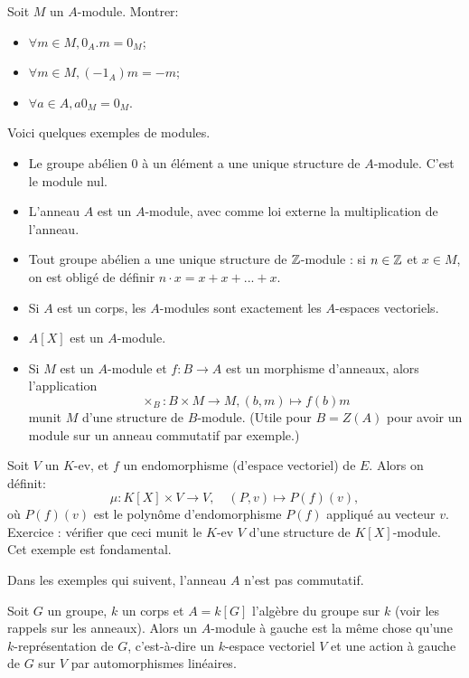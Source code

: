 \begin{exo}
Soit $M$ un $A$-module. Montrer:
\begin{itemize}
\item $\forall m\in M, 0_A.m = 0_M$;
\item $\forall m\in M, (-1_A)m = -m$;
\item $\forall a\in A, a0_M = 0_M$.
\end{itemize}
\end{exo}

\begin{exemple} Voici quelques exemples de modules.
\begin{itemize}
\item Le groupe abélien $0$ à un élément a une unique structure de $A$-module. C'est le module nul.
\item L'anneau $A$ est un $A$-module, avec comme loi externe la multiplication de l'anneau.
\item Tout groupe abélien a une unique structure de $\mathbb{Z}$-module : si $n \in \mathbb{Z}$ et $x \in M$, on est obligé de définir $n\cdot x = x+x+...+x$.
\item Si $A$ est un corps, les $A$-modules sont exactement les $A$-espaces vectoriels.
\item $A[X]$ est un $A$-module.
\item Si $M$ est un $A$-module et $f : B \to A$ est un morphisme d'anneaux, alors l'application 
\[\times_B : B \times M \to M, (b,m) \mapsto f(b)m
\]
munit $M$ d'une structure de $B$-module.
 (Utile pour $B = Z(A)$ pour avoir un module sur un anneau commutatif par exemple.)
\end{itemize}
\end{exemple}

\begin{exemple}[fondamental]
Soit $V$ un $K$-ev, et $f$ un endomorphisme (d'espace vectoriel) de $E$. Alors on définit:
\[\mu : K[X] \times V \to V,\quad (P,v)\mapsto P(f)(v),
\]
où $P(f)(v)$ est le polynôme d'endomorphisme $P(f)$ appliqué au vecteur $v$. Exercice : vérifier que ceci munit le $K$-ev $V$ d'une structure de $K[X]$-module. Cet exemple est fondamental.
\end{exemple}

Dans les exemples qui suivent, l'anneau $A$ n'est pas commutatif. 


\begin{exemple}
Soit $G$ un groupe, $k$ un corps et $A = k[G]$ l'algèbre du groupe sur $k$ (voir les rappels sur les anneaux). Alors un $A$-module à gauche est la même chose qu'une $k$-représentation de $G$, c'est-à-dire un $k$-espace vectoriel $V$ et une action à gauche de $G$ sur $V$ par automorphismes linéaires.
\end{exemple}

